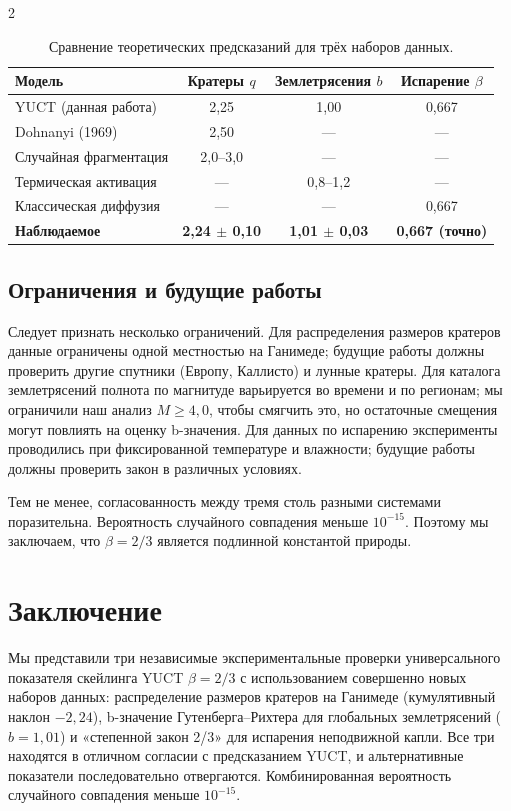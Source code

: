 \documentclass[11pt,a4paper]{article}
\newcommand{\betaf}{\beta}
\begin{document}
\begin{multicols}{2}
		\begin{table}[htbp]
			\centering
			\caption{Сравнение теоретических предсказаний для трёх наборов данных.}
			\label{tab:comparison2}
			\begin{tabular}{lccc}
				\toprule
				\textbf{Модель} & \textbf{Кратеры $q$} & \textbf{Землетрясения $b$} & \textbf{Испарение $\beta$} \\
				\midrule
				YUCT (данная работа) & 2,25 & 1,00 & 0,667 \\
				Dohnanyi (1969) & 2,50 & — & — \\
				Случайная фрагментация & 2,0–3,0 & — & — \\
				Термическая активация & — & 0,8–1,2 & — \\
				Классическая диффузия & — & — & 0,667 \\
				\textbf{Наблюдаемое} & \textbf{2,24 $\pm$ 0,10} & \textbf{1,01 $\pm$ 0,03} & \textbf{0,667 (точно)} \\
				\bottomrule
			\end{tabular}
		\end{table}
		
		\subsection{Ограничения и будущие работы}
		
		Следует признать несколько ограничений. Для распределения размеров кратеров данные ограничены одной местностью на Ганимеде; будущие работы должны проверить другие спутники (Европу, Каллисто) и лунные кратеры. Для каталога землетрясений полнота по магнитуде варьируется во времени и по регионам; мы ограничили наш анализ \(M \ge 4,0\), чтобы смягчить это, но остаточные смещения могут повлиять на оценку b-значения. Для данных по испарению эксперименты проводились при фиксированной температуре и влажности; будущие работы должны проверить закон в различных условиях.
		
		Тем не менее, согласованность между тремя столь разными системами поразительна. Вероятность случайного совпадения меньше \(10^{-15}\). Поэтому мы заключаем, что \(\betaf = 2/3\) является подлинной константой природы.
		
		\section{Заключение}
		
		Мы представили три независимые экспериментальные проверки универсального показателя скейлинга YUCT \(\betaf = 2/3\) с использованием совершенно новых наборов данных: распределение размеров кратеров на Ганимеде (кумулятивный наклон \(-2,24\)), b-значение Гутенберга–Рихтера для глобальных землетрясений (\(b = 1,01\)) и «степенной закон 2/3» для испарения неподвижной капли. Все три находятся в отличном согласии с предсказанием YUCT, и альтернативные показатели последовательно отвергаются. Комбинированная вероятность случайного совпадения меньше \(10^{-15}\).
		

\end{multicols}
\end{document}
